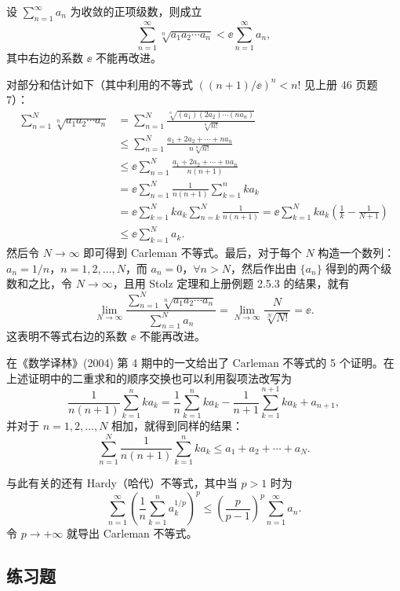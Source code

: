 \begin{xexample}
设 $\sum_{n=1}^{\infty}a_n$ 为收敛的正项级数，则成立
\[
\sum_{n=1}^{\infty}\sqrt[n]{a_1a_2\cdots a_n}<\ee\sum_{n=1}^{\infty}a_n,
\]
其中右边的系数 $\ee$ 不能再改进。
\end{xexample}
\begin{xproof}
对部分和估计如下（其中利用的不等式 $((n+1)/\ee)^n<n!$ 见上册 46 页题 7）：
\[
\begin{aligned}
\sum_{n=1}^{N}\sqrt[n]{a_1a_2\cdots a_n}
&=\sum_{n=1}^{N}\frac{\sqrt[n]{(a_1)(2a_2)\cdots(na_n)}}{\sqrt[n]{n!}}\\
&\leq\sum_{n=1}^{N}\frac{a_1+2a_2+\cdots+na_n}{n\sqrt[n]{n!}}\\
&\leq\ee\sum_{n=1}^{N}\frac{a_1+2a_2+\cdots+na_n}{n(n+1)}\\
&=\ee\sum_{n=1}^{N}\frac1{n(n+1)}\sum_{k=1}^{n}ka_k\\
&=\ee\sum_{k=1}^{N}ka_k\sum_{n=k}^{N}\frac1{n(n+1)}
=\ee\sum_{k=1}^{N}ka_k\left(\frac1k-\frac1{N+1}\right)\\
&\leq\ee\sum_{k=1}^{N}a_k.
\end{aligned}
\]
然后令 $N\to\infty$ 即可得到 Carleman 不等式。最后，对于每个 $N$ 构造一个数列：$a_n=1/n$，$n=1,2,\ldots,N$，而 $a_n=0$，$\forall n>N$，然后作出由 $\{a_n\}$ 得到的两个级数和之比，令 $N\to\infty$，且用 Stolz 定理和上册例题 2.5.3 的结果，就有
\[
\lim_{N\to\infty}\frac{\sum_{n=1}^{N}\sqrt[n]{a_1a_2\cdots a_n}}{\sum_{n=1}^{N}a_n}
=\lim_{N\to\infty}\frac{N}{\sqrt[N]{N!}}=\ee.
\]
这表明不等式右边的系数 $\ee$ 不能再改进。
\end{xproof}

\begin{xremark}
在《数学译林》(2004) 第 4 期中的一文给出了 Carleman 不等式的 5 个证明。在上述证明中的二重求和的顺序交换也可以利用裂项法改写为
\[
\frac1{n(n+1)}\sum_{k=1}^{n}ka_k=\frac1n\sum_{k=1}^{n}ka_k-\frac1{n+1}\sum_{k=1}^{n+1}ka_k+a_{n+1},
\]
并对于 $n=1,2,\ldots,N$ 相加，就得到同样的结果：
\[
\sum_{n=1}^{N}\frac1{n(n+1)}\sum_{k=1}^{n}ka_k\leq a_1+a_2+\cdots+a_N.
\]
\end{xremark}

\begin{xremark}
与此有关的还有 Hardy（哈代）不等式，其中当 $p>1$ 时为
\[
\sum_{n=1}^{\infty}\left(\frac1n\sum_{k=1}^{n}a_k^{1/p}\right)^p\leq\left(\frac p{p-1}\right)^p\sum_{n=1}^{\infty}a_n.
\]
令 $p\to+\infty$ 就导出 Carleman 不等式。
\end{xremark}

\subsection{练习题}

